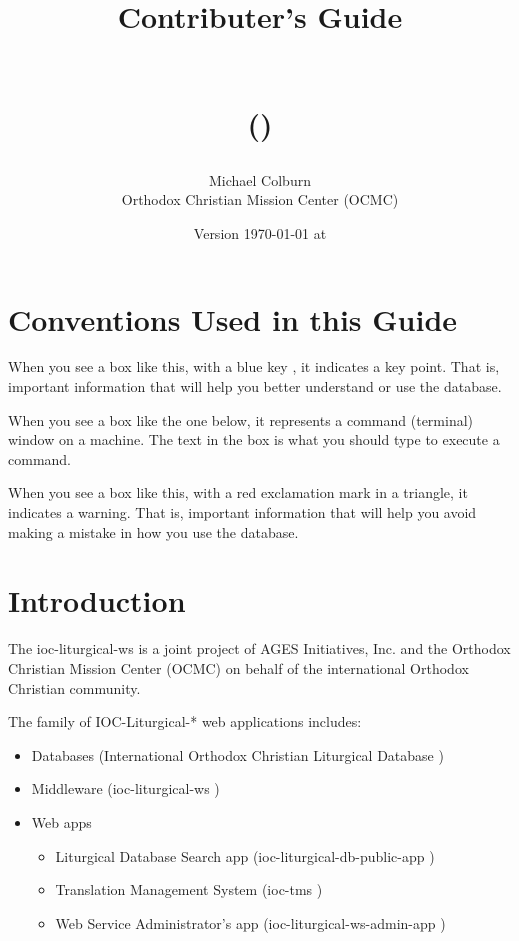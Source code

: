 \documentclass[]{memoir}
\title{Contributer's Guide\\\bigskip

\docTopicName\\   (\docTopic) \\\bigskip
}
\author{Michael Colburn\\Orthodox Christian Mission Center (OCMC)}
\date{Version {\today} at {\currenttime}}
\def\iocLDbName{International Orthodox Christian Liturgical Database }%
\def\iocLDbApp{ioc-liturgical-db-public-app }%
\def\iocWs{ioc-liturgical-ws }%
\def\iocTms{ioc-tms }%
\def\iocWsAdmin{ioc-liturgical-ws-admin-app }%
\def\docTopic{\iocWs}
\begin{document}
\maketitle
\tableofcontents

\vfill

\pagebreak

\chapter{Conventions Used in this Guide}

\begin{boxed}
When you see a box like this, with a blue key \color{blue}\faKey{}\color{black}, it indicates a key point.  That is, important information that will help you better understand or use the database.
\end{boxed}
When you see a box like the one below, it represents a command (terminal) window on a machine.  The text in the box is what you should type to execute a command.
\begin{bash}
\end{bash}
\begin{warning}
When you see a box like this, with a red exclamation mark in a triangle, it indicates a warning.  That is, important information that will help you avoid making a mistake in how you use the database.
\end{warning}

\chapter{Introduction}

The \docTopic  is a joint project of AGES Initiatives, Inc. and the Orthodox Christian Mission Center (OCMC) on behalf of the international Orthodox Christian community. 

The family of IOC-Liturgical-* web applications includes:

\begin{itemize}
    \item Databases (\iocLDbName)
    \item Middleware (\iocWs)
    \item Web apps
        \begin{itemize}
            \item Liturgical Database Search app (\iocLDbApp)
            \item Translation Management System (\iocTms)
            \item Web Service Administrator's app (\iocWsAdmin{})        \end{itemize}
\end{itemize}
\end{document}
